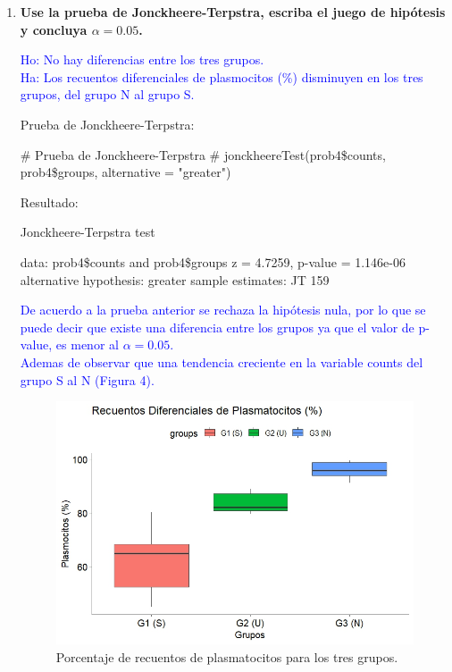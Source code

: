 \documentclass[a4paper,12pt]{article}
\begin{document}
\begin{enumerate}  [label=\textbf{\alph*})]
\item \textbf{Use la prueba de Jonckheere-Terpstra, escriba el juego de hipótesis y concluya \(\alpha=0.05\).}\\
\begin{center}
\textcolor{blue}{Ho: No hay diferencias entre los tres grupos.\\
Ha: Los recuentos diferenciales de plasmocitos (\%) disminuyen en los tres grupos, del grupo N al grupo S.}
\end{center}
Prueba de Jonckheere-Terpstra:
\begin{MyVerbatim}
# Prueba de Jonckheere-Terpstra #
jonckheereTest(prob4\$counts, prob4\$groups, alternative = "greater")	
\end{MyVerbatim} 
Resultado:
\begin{MyVerbatim}
Jonckheere-Terpstra test

data:  prob4\$counts and prob4\$groups
z = 4.7259, p-value = 1.146e-06
alternative hypothesis: greater
sample estimates:
JT 
159
\end{MyVerbatim}
\textcolor{blue}{De acuerdo a la prueba anterior se rechaza la hipótesis nula, por lo que se puede decir que existe una diferencia entre los grupos ya que el valor de p-value, es menor al \(\alpha=0.05\).}\\
\textcolor{blue}{Ademas de observar que una tendencia creciente en la variable counts del grupo S al N (Figura 4).}
\begin{figure}[H]
	\centering
	\includegraphics[width=0.7\linewidth]{RDP_prob4}
	\caption[RDPprob4]{Porcentaje de recuentos de plasmatocitos para los tres grupos.}
	\label{fig:rdpprob4}
\end{figure}
\end{enumerate}
\newpage
\end{document}

